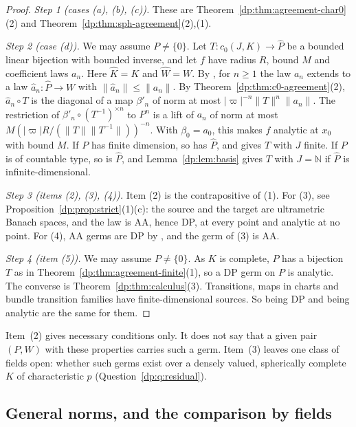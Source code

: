 \documentclass[11pt]{amsart}
\theoremstyle{definition}
\theoremstyle{remark}
\numberwithin{equation}{section}
\newcommand{\N}{\mathbb N}
\newcommand{\abs}[1]{\lvert #1\rvert}
\newcommand{\norm}[1]{\lVert #1\rVert}
\newcommand{\Kh}{\widehat K}
\theoremstyle{plain}
\theoremstyle{definition}
\theoremstyle{plain}
\begin{document}
\begin{proof}
\emph{Step 1 (cases (a), (b), (c)).} These are Theorem~\ref{dp:thm:agreement-char0}(2) and Theorem~\ref{dp:thm:sph-agreement}(2),(1).

\emph{Step 2 (case (d)).} We may assume $P\ne\{0\}$. Let $T\colon c_0(J,K)\to\widehat P$ be a bounded linear bijection with bounded inverse, and let $f$ have radius $R$, bound $M$ and coefficient laws $a_n$. Here $\Kh=K$ and $\widehat W=W$. By \cite[Lemma~Q.13(1)]{I}, for $n\ge1$ the law $a_n$ extends to a law $\hat a_n\colon\widehat P\to W$ with $\norm{\hat a_n}\le\norm{a_n}$. By Theorem~\ref{dp:thm:c0-agreement}(2), $\hat a_n\circ T$ is the diagonal of a map $\beta'_n$ of norm at most $\abs\varpi^{-n}\norm T^n\norm{a_n}$. The restriction of $\beta'_n\circ(T^{-1})^{\times n}$ to $P^n$ is a lift of $a_n$ of norm at most $M(\abs\varpi R/(\norm T\norm{T^{-1}}))^{-n}$. With $\beta_0=a_0$, this makes $f$ analytic at $x_0$ with bound $M$. If $P$ has finite dimension, so has $\widehat P$, and \cite[Lemma~A.3]{I} gives $T$ with $J$ finite. If $P$ is of countable type, so is $\widehat P$, and Lemma~\ref{dp:lem:basis} gives $T$ with $J=\N$ if $\widehat P$ is infinite-dimensional.

\emph{Step 3 (items (2), (3), (4)).} Item (2) is the contrapositive of (1). For (3), see Proposition~\ref{dp:prop:strict}(1)(c): the source and the target are ultrametric Banach spaces, and the law is AA, hence DP, at every point and analytic at no point. For (4), AA germs are DP by \cite[Proposition~14.9(1)]{I}, and the germ of (3) is AA.

\emph{Step 4 (item (5)).} We may assume $P\ne\{0\}$. As $K$ is complete, $P$ has a bijection $T$ as in Theorem~\ref{dp:thm:agreement-finite}(1), so a DP germ on $P$ is analytic. The converse is Theorem~\ref{dp:thm:calculus}(3). Transitions, maps in charts and bundle transition families have finite-dimensional sources. So being DP and being analytic are the same for them.
\end{proof}

Item~(2) gives necessary conditions only. It does not say that a given pair $(P,W)$ with these properties carries such a germ. Item~(3) leaves one class of fields open: whether such germs exist over a densely valued, spherically complete $K$ of characteristic $p$ (Question~\ref{dp:q:residual}).

\subsection{General norms, and the comparison by fields}\label{dp:ssec:agree-general}
\end{document}
